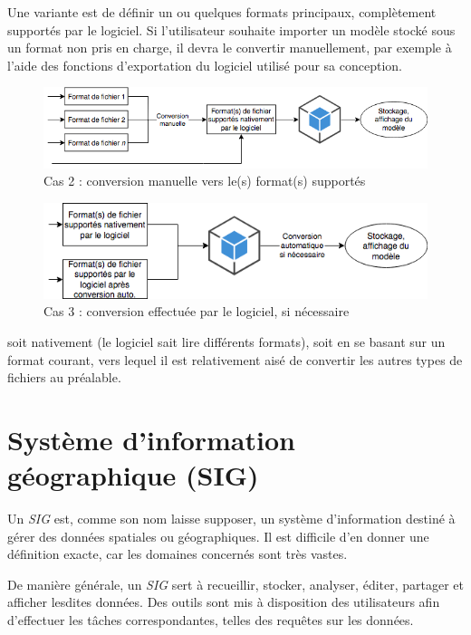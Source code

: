 Une variante est de définir un ou quelques formats principaux, complètement supportés par le logiciel. Si l'utilisateur souhaite importer un modèle stocké sous un format non pris en charge, il devra le convertir manuellement, par exemple à l'aide des fonctions d'exportation du logiciel utilisé pour sa conception.

\begin{figure}[ht]
    \centering
    \includegraphics[width=\linewidth]{Figures/file-importation-process-manual-conversion.png}
    \caption{Cas 2 : conversion manuelle vers le(s) format(s) supportés}
    \label{fig:file-importation-process-manual-conversion}
\end{figure}

\begin{figure}[ht]
    \centering
    \includegraphics[width=\linewidth]{Figures/file-importation-process-auto-conversion.png}
    \caption{Cas 3 : conversion effectuée par le logiciel, si nécessaire}
    \label{fig:file-importation-process-auto-conversion}
\end{figure}


soit nativement (le logiciel sait lire différents formats), soit en se basant sur un format courant, vers lequel il est relativement aisé de convertir les autres types de fichiers au préalable.

\section{Système d'information géographique (SIG)}
Un \textit{SIG} est, comme son nom laisse supposer, un système d'information destiné à gérer des données spatiales ou géographiques. Il est difficile d'en donner une définition exacte, car les domaines concernés sont très vastes.

De manière générale, un \textit{SIG} sert à recueillir, stocker, analyser, éditer, partager et afficher lesdites données. Des outils sont mis à disposition des utilisateurs afin d'effectuer les tâches correspondantes, telles des requêtes sur les données.

